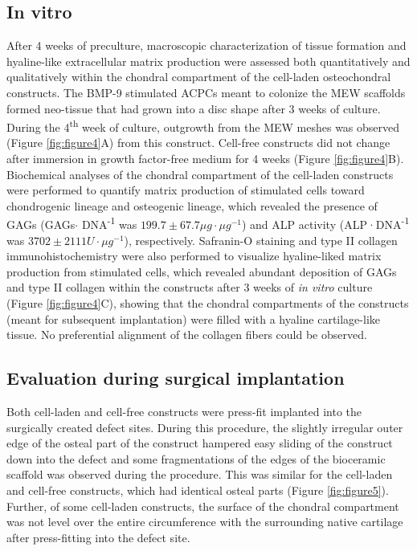 \documentclass[twocolumn, empirical, authordate, issue]{jote-new-article}
\begin{document}
\subsection{In vitro} 

After 4 weeks of preculture, macroscopic characterization of tissue formation and hyaline-like extracellular matrix production were assessed both quantitatively and qualitatively within the chondral compartment of the cell-laden osteochondral constructs. The BMP-9 stimulated ACPCs meant to colonize the MEW scaffolds formed neo-tissue that had grown into a disc shape after 3 weeks of culture. During the 4\textsuperscript{th} week of culture, outgrowth from the MEW meshes was observed (Figure \ref{fig:figure4}A) from this construct. Cell-free constructs did not change after immersion in growth factor-free medium for 4 weeks (Figure \ref{fig:figure4}B). Biochemical analyses of the chondral compartment of the cell-laden constructs were performed to quantify matrix production of stimulated cells toward chondrogenic lineage and osteogenic lineage, which revealed the presence of GAGs (GAGs$\cdot$ DNA\textsuperscript{-1} was $199.7 \pm 67.7 \mu g\cdot \mu g^{-1}$) and ALP activity (ALP·DNA\textsuperscript{-1} was $3702 \pm 2111 U\cdot\mu g^{-1}$), respectively. Safranin-O staining and type II collagen immunohistochemistry were also performed to visualize hyaline-liked matrix production from stimulated cells, which revealed abundant deposition of GAGs and type II collagen within the constructs after 3 weeks of \emph{in vitro} culture (Figure \ref{fig:figure4}C), showing that the chondral compartments of the constructs (meant for subsequent implantation) were filled with a hyaline cartilage-like tissue. No preferential alignment of the collagen fibers could be observed.



\subsection{Evaluation during surgical implantation} 

Both cell-laden and cell-free constructs were press-fit implanted into the surgically created defect sites. During this procedure, the slightly irregular outer edge of the osteal part of the construct hampered easy sliding of the construct down into the defect and some fragmentations of the edges of the bioceramic scaffold was observed during the procedure. This was similar for the cell-laden and cell-free constructs, which had identical osteal parts (Figure \ref{fig:figure5}). Further, of some cell-laden constructs, the surface of the chondral compartment was not level over the entire circumference with the surrounding native cartilage after press-fitting into the defect site.
\end{document}
